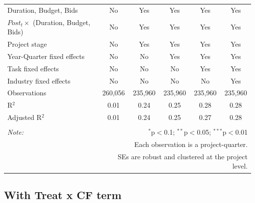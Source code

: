 \documentclass[
]{article}
\begin{document}
\begin{table}[H]
\begin{tabular}{@{\extracolsep{-2pt}}lccccc}
Duration, Budget, Bids & No & Yes & Yes & Yes & Yes \\ 
$Post_t \times $  (Duration, Budget, Bids) & No & Yes & Yes & Yes & Yes \\ 
Project stage & No & Yes & Yes & Yes & Yes \\ 
Year-Quarter fixed effects & No & No & Yes & Yes & Yes \\ 
Task fixed effects & No & No & No & Yes & Yes \\ 
Industry fixed effects & No & No & No & No & Yes \\ 
Observations & 260,056 & 235,960 & 235,960 & 235,960 & 235,960 \\ 
R$^{2}$ & 0.01 & 0.24 & 0.25 & 0.28 & 0.28 \\ 
Adjusted R$^{2}$ & 0.01 & 0.24 & 0.25 & 0.27 & 0.28 \\ 
\hline 
\hline \\[-1.8ex] 
\textit{Note:}  & \multicolumn{5}{r}{$^{*}$p$<$0.1; $^{**}$p$<$0.05; $^{***}$p$<$0.01} \\ 
 & \multicolumn{5}{r}{Each observation is a project-quarter.} \\ 
 & \multicolumn{5}{r}{SEs are robust and clustered at the project level.} \\ 
\end{tabular} 
\end{table}

\hypertarget{with-treat-x-cf-term}{%
\subsection{With Treat x CF term}\label{with-treat-x-cf-term}}
\end{document}
